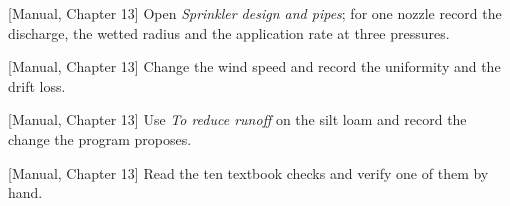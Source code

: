 \begin{exlist}
\item {\color{khblue}[Manual, Chapter 13]} Open \emph{Sprinkler design and pipes}; for one nozzle record the discharge, the wetted radius and the application rate at three pressures.\par{}
\item {\color{khblue}[Manual, Chapter 13]} Change the wind speed and record the uniformity and the drift loss.\par{}
\item {\color{khblue}[Manual, Chapter 13]} Use \emph{To reduce runoff} on the silt loam and record the change the program proposes.\par{}
\item {\color{khblue}[Manual, Chapter 13]} Read the ten textbook checks and verify one of them by hand.\par{}
\end{exlist}
